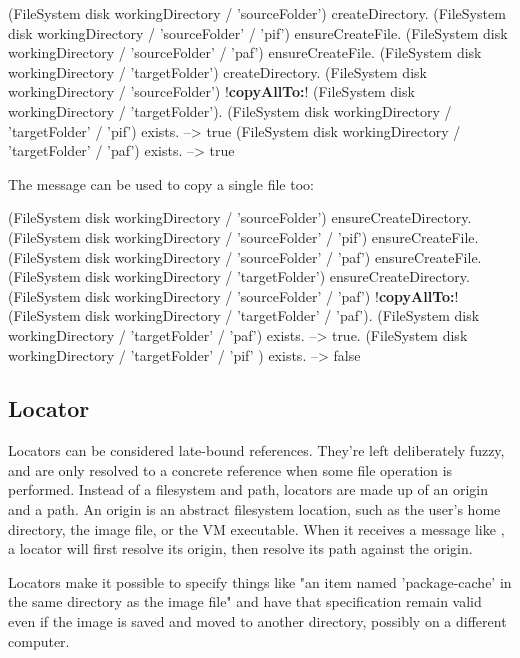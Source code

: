 \documentclass[a4paper,10pt,twoside]{book}
\begin{document}
\begin{code}{}
(FileSystem disk workingDirectory / 'sourceFolder') createDirectory. 
(FileSystem disk workingDirectory / 'sourceFolder' / 'pif') ensureCreateFile.
(FileSystem disk workingDirectory / 'sourceFolder' / 'paf') ensureCreateFile.
(FileSystem disk workingDirectory / 'targetFolder') createDirectory. 
(FileSystem disk workingDirectory / 'sourceFolder') !\textbf{copyAllTo:}! (FileSystem disk workingDirectory / 'targetFolder').
(FileSystem disk workingDirectory / 'targetFolder' / 'pif') exists.
  --> true
(FileSystem disk workingDirectory / 'targetFolder' / 'paf') exists.
 --> true
 \end{code}


The message  can be used to copy a single file too:

\begin{code}{}
(FileSystem disk workingDirectory / 'sourceFolder') ensureCreateDirectory. 
(FileSystem disk workingDirectory /  'sourceFolder' / 'pif') ensureCreateFile.
(FileSystem disk workingDirectory /  'sourceFolder' / 'paf') ensureCreateFile.
(FileSystem disk workingDirectory / 'targetFolder') ensureCreateDirectory. 
(FileSystem disk workingDirectory / 'sourceFolder' / 'paf') !\textbf{copyAllTo:}! (FileSystem disk workingDirectory / 'targetFolder' / 'paf').
(FileSystem disk workingDirectory /  'targetFolder' / 'paf') exists.
	--> true.
(FileSystem disk workingDirectory /  'targetFolder' / 'pif' ) exists.
  --> false
\end{code}

\subsection{Locator}

Locators can be considered late-bound references. They're left deliberately fuzzy, and are only resolved to a concrete reference when some file operation is performed. Instead of a filesystem and path, locators are made up of an origin and a path. An origin is an abstract filesystem location, such as the user's home directory, the image file, or the VM executable. When it receives a message like , a locator will first resolve its origin, then resolve its path against the origin.

Locators make it possible to specify things like "an item named 'package-cache' in the same directory as the image file" and have that specification remain valid even if the image is saved and moved to another directory, possibly on a different computer.
\end{document}

